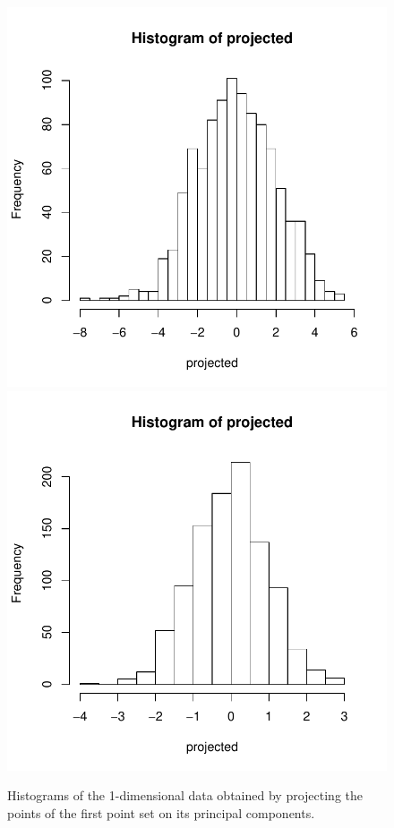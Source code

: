 \documentclass{article}
\begin{document}
\begin{figure} \centering
	\includegraphics[scale=\sscale]{histo1-1}
	\includegraphics[scale=\sscale]{histo1-2}
	\caption{Histograms of the 1-dimensional data obtained by projecting the points of the first point set on its principal components.} \label{fig:histo}
\end{figure}
\end{document}
